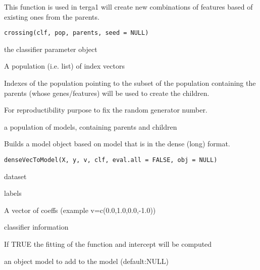 \documentclass[a4paper]{book}
\begin{document}
%
\begin{Description}
This function is used in terga1 will create new combinations of features based of existing ones from the parents.
\end{Description}
%
\begin{Usage}
\begin{verbatim}
crossing(clf, pop, parents, seed = NULL)
\end{verbatim}
\end{Usage}
%
\begin{Arguments}
\begin{ldescription}
\item[\code{clf:}] the classifier parameter object

\item[\code{pop:}] A population (i.e. list) of index vectors

\item[\code{parents:}] Indexes of the population pointing to the subset of the population containing the parents (whose genes/features) will be used to create the children.

\item[\code{seed:}] For reproductibility purpose to fix the random generator number.
\end{ldescription}
\end{Arguments}
%
\begin{Value}
a population of models, containing parents and children
\end{Value}
%
\begin{Description}
Builds a model object based on model that is in the dense (long) format.
\end{Description}
%
\begin{Usage}
\begin{verbatim}
denseVecToModel(X, y, v, clf, eval.all = FALSE, obj = NULL)
\end{verbatim}
\end{Usage}
%
\begin{Arguments}
\begin{ldescription}
\item[\code{X:}] dataset

\item[\code{y:}] labels

\item[\code{v:}] A vector of coeffs (example v=c(0.0,1.0,0.0,-1.0))

\item[\code{clf:}] classifier information

\item[\code{eval.all:}] If TRUE the fitting of the function and intercept will be computed

\item[\code{obj:}] an object model to add to the model (default:NULL)
\end{ldescription}
\end{Arguments}
\end{document}
